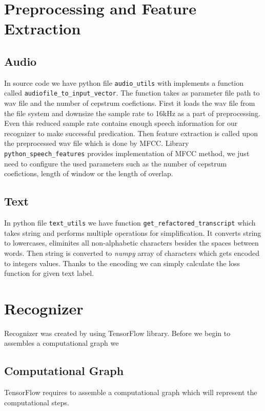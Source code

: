\section{Preprocessing and Feature Extraction}


\subsection{Audio}

In source code we have python file \texttt{audio\_utils} with implements a function called \texttt{audiofile\_to\_input\_vector}.
The function takes as parameter file path to wav file and the number of cepstrum coefictions.
First it loads the wav file from the file system and downsize the sample rate to 16kHz as a part of preprocessing.
Even this reduced sample rate contains enough speech information for our recognizer to make successful predication.
Then feature extraction is called upon the preprocessed wav file which is done by MFCC.
Library \texttt{python\_speech\_features} provides implementation of MFCC method, we just need to configure the used parameters such as the number of cepstrum coefictions, length of window or the length of overlap.

\subsection{Text}

In python file \texttt{text\_utils} we have function \texttt{get\_refactored\_transcript} which takes string and performs multiple operations for simplification.
It converts string to lowercases, eliminites all non-alphabetic characters besides the spaces between words.
Then string is converted to \textit{numpy} array of characters which gets encoded to integers values.
Thanks to the encoding we can simply calculate the loss function for given text label.


\section{Recognizer}

Recognizer was created by using TensorFlow library. Before we begin to assembles a computational graph we

\subsection{Computational Graph}

TensorFlow requires to assemble a computational graph which will represent the computational steps.

